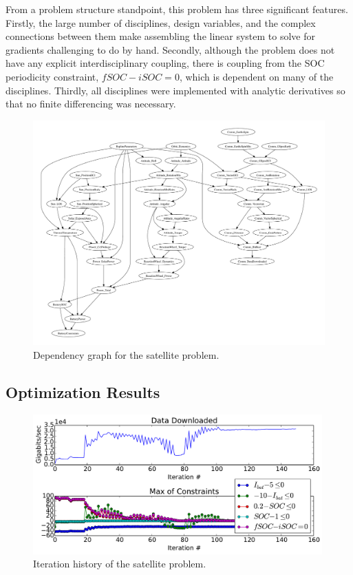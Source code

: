 \documentclass[]{aiaa-tc} %
\begin{document}
    From a problem structure standpoint, this problem has three significant features. Firstly, the large number of
    disciplines, design variables, and the complex connections between them make assembling the linear system to solve for gradients
    challenging to do by hand. Secondly, although the problem does not have any explicit interdisciplinary coupling,
    there is coupling from the SOC periodicity constraint, $fSOC - iSOC = 0$, which is dependent on many of the
    disciplines. Thirdly, all disciplines were implemented with analytic derivatives so that no finite differencing was
    necessary.

    \begin{figure}[!htb]\begin{center}
      \includegraphics[width=.95\textwidth]{images/CADRE.pdf}
      \caption{ Dependency graph for the satellite problem. \label{fig:cadre_graph}}
    \end{center}\end{figure}

    \subsection{Optimization Results}


        \begin{figure}[!htb]
        \centering
        \includegraphics[width=0.99\textwidth]{images/cadre_opt_progress}
        \caption[width=0.22\textwidth]{Iteration history of the satellite problem.
        \label{convergence}
        }
        \end{figure}
\end{document}

